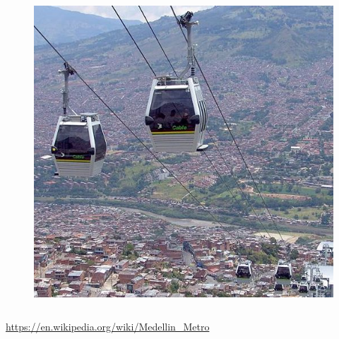 \documentclass[aspectratio=169]{beamer}
\begin{document}
\begin{frame}
\begin{columns}
		\begin{column}{0.5\textwidth}
			\begin{figure}
				\centering
				\includegraphics[width=1\linewidth]{images/metrocable.jpg}
			\end{figure}
			
		\end{column}
		
	\end{columns}
	
	\tiny\url{https://en.wikipedia.org/wiki/Medellin_Metro}
	
\end{frame}
\end{document}

